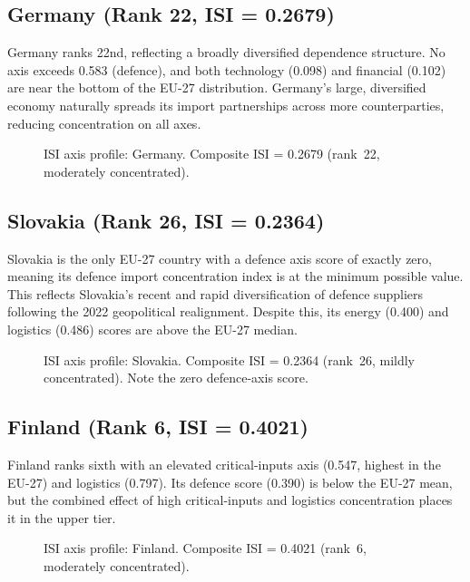 \subsection{Germany (Rank 22, ISI = 0.2679)}

Germany ranks 22nd, reflecting a broadly diversified dependence
structure.  No axis exceeds 0.583 (defence), and both technology
(0.098) and financial (0.102) are near the bottom of the EU-27
distribution.  Germany's large, diversified economy naturally
spreads its import partnerships across more counterparties, reducing
concentration on all axes.

\begin{figure}[htbp]
\centering

\caption{ISI axis profile: Germany.  Composite ISI = 0.2679
  (rank~22, moderately concentrated).}
\label{fig:radar-DE}
\end{figure}

\subsection{Slovakia (Rank 26, ISI = 0.2364)}

Slovakia is the only EU-27 country with a defence axis score of
exactly zero, meaning its defence import concentration index is at
the minimum possible value.  This reflects Slovakia's recent and
rapid diversification of defence suppliers following the 2022
geopolitical realignment.  Despite this, its energy (0.400) and
logistics (0.486) scores are above the EU-27 median.

\begin{figure}[htbp]
\centering

\caption{ISI axis profile: Slovakia.  Composite ISI = 0.2364
  (rank~26, mildly concentrated).  Note the zero defence-axis score.}
\label{fig:radar-SK}
\end{figure}

\subsection{Finland (Rank 6, ISI = 0.4021)}

Finland ranks sixth with an elevated critical-inputs axis (0.547,
highest in the EU-27) and logistics (0.797).  Its defence score
(0.390) is below the EU-27 mean, but the combined effect of high
critical-inputs and logistics concentration places it in the upper
tier.

\begin{figure}[htbp]
\centering

\caption{ISI axis profile: Finland.  Composite ISI = 0.4021
  (rank~6, moderately concentrated).}
\label{fig:radar-FI}
\end{figure}

